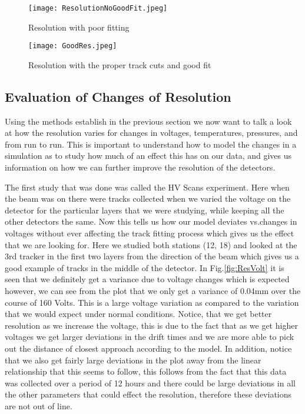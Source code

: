 \documentclass[./Thesis]{subfiles}
\begin{document}
\begin{figure}
	\centerline{\texttt{[image: ResolutionNoGoodFit.jpeg]}}
	\caption[Spacial Resolution with no track cuts]{ Resolution with poor fitting}
	\label{fig:NoGoodRes}
\end{figure}
	
\begin{figure}
	\centerline{\texttt{[image: GoodRes.jpeg]}}
	\caption[Good Resolution]{ Resolution with the proper track cuts and good fit}
	\label{fig:goodRes}
\end{figure} 		
	
	
	 
\subsection{Evaluation of Changes of Resolution}

	Using the methods establish in the previous section we now want to talk a look at how the resolution varies for changes in voltages, temperatures, pressures, and from run to run. This is important to understand how to model the changes in a simulation as to study how much of an effect this has on our data, and gives us information on how we can further improve the resolution of the detectors.
	
	The first study that was done was called the HV Scans experiment. Here when the beam was on there were tracks collected when we varied the voltage on the detector for the particular layers that we were studying, while keeping all the other detectors the same. Now this tells us how our model deviates vs.changes in voltages without ever affecting the track fitting process which gives us the effect that we are looking for.  Here we studied both stations (12, 18) and looked at the 3rd tracker in the first two layers from the direction of the beam which gives us a good example of tracks in the middle of the detector. In Fig.\ref{fig:ResVolt} it is seen that we definitely get a variance due to voltage changes which is expected however, we can see from the plot that we only get a variance of 0.04mm over the course of 160 Volts. This is a large voltage variation as compared to the variation that we would expect under normal conditions. Notice, that we get better resolution as we increase the voltage, this is due to the fact that as we get higher voltages we get larger deviations in the drift times and we are more able to pick out the distance of closest approach according to the model. In addition, notice that we also get fairly large deviations in the plot away from the linear relationship that this seems to follow, this follows from the fact that this data was collected over a period of 12 hours and there could be large deviations in all the other parameters that could effect the resolution, therefore these deviations are not out of line.
\end{document}

